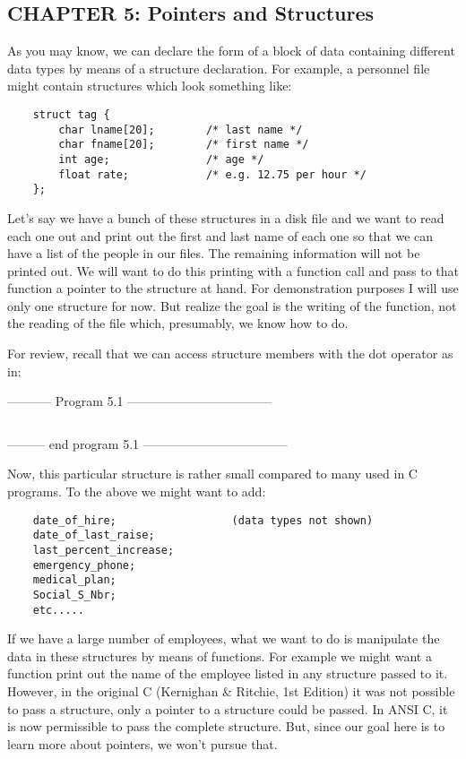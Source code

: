 \hypertarget{chapter-5-pointers-and-structures}{%
\subsection{CHAPTER 5: Pointers and
Structures}\label{chapter-5-pointers-and-structures}}

As you may know, we can declare the form of a block of data containing
different data types by means of a structure declaration. For example, a
personnel file might contain structures which look something like:

\begin{verbatim}
    struct tag {
        char lname[20];        /* last name */
        char fname[20];        /* first name */
        int age;               /* age */
        float rate;            /* e.g. 12.75 per hour */
    };
\end{verbatim}

Let's say we have a bunch of these structures in a disk file and we want
to read each one out and print out the first and last name of each one
so that we can have a list of the people in our files. The remaining
information will not be printed out. We will want to do this printing
with a function call and pass to that function a pointer to the
structure at hand. For demonstration purposes I will use only one
structure for now. But realize the goal is the writing of the function,
not the reading of the file which, presumably, we know how to do.

For review, recall that we can access structure members with the dot
operator as in:

-----------  Program 5.1  -----------------------------------
\inputminted[breaklines]{c}{../src/ch5-1.c}
--------- end program 5.1 -----------------------------------

Now, this particular structure is rather small compared to many used in
C programs. To the above we might want to add:

\begin{verbatim}
    date_of_hire;                  (data types not shown)
    date_of_last_raise;
    last_percent_increase;
    emergency_phone;
    medical_plan;
    Social_S_Nbr;
    etc.....
\end{verbatim}

If we have a large number of employees, what we want to do is manipulate
the data in these structures by means of functions. For example we might
want a function print out the name of the employee listed in any
structure passed to it. However, in the original C (Kernighan \&
Ritchie, 1st Edition) it was not possible to pass a structure, only a
pointer to a structure could be passed. In ANSI C, it is now permissible
to pass the complete structure. But, since our goal here is to learn
more about pointers, we won't pursue that.

